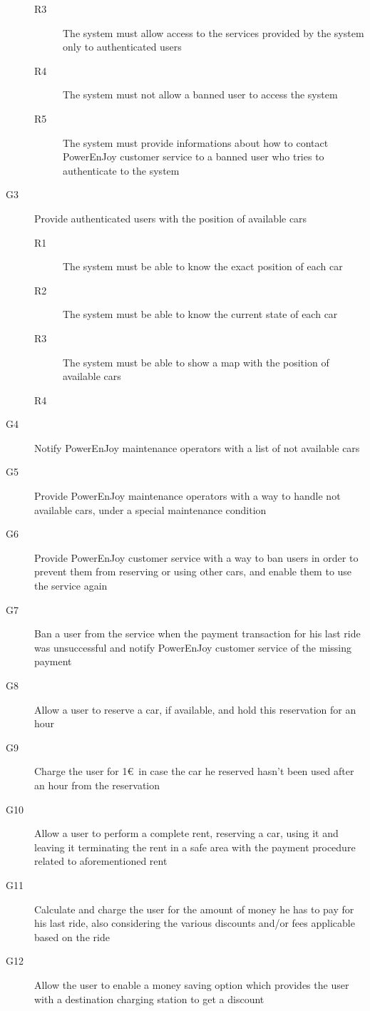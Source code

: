\begin{description}
\begin{description}
			\item[R3] The system must allow access to the services provided by the system only to authenticated users 
			\item[R4] The system must not allow a banned user to access the system
			\item[R5] The system must provide informations about how to contact PowerEnJoy customer service to a banned user who tries to authenticate to the system
		\end{description}
		\item[G3] Provide authenticated users with the position of available cars
		\begin{description}
			\item[R1] The system must be able to know the exact position of each car
			\item[R2] The system must be able to know the current state of each car
			\item[R3] The system must be able to show a map with the position of available cars
			\item[R4] 
		\end{description}
		\item[G4] Notify PowerEnJoy maintenance operators with a list of not available cars 
		\item[G5] Provide PowerEnJoy maintenance operators with a way to handle not available cars, under a special maintenance condition
		\item[G6] Provide PowerEnJoy customer service with a way to ban users in order to prevent them from reserving or using other cars, and enable them to use the service again
		\item[G7] Ban a user from the service when the payment transaction for his last ride was unsuccessful and notify PowerEnJoy customer service of the missing payment
		\item[G8] Allow a user to reserve a car, if available, and hold this reservation for an hour	
		\item[G9] Charge the user for 1\euro\ in case the car he reserved hasn't been used after an hour from the reservation
		\item[G10] Allow a user to perform a complete rent, reserving a car, using it and leaving it terminating the rent in a safe area with the payment procedure related to aforementioned rent
		\item[G11] Calculate and charge the user for the amount of money he has to pay for his last ride, also considering the various discounts and/or fees applicable based on the ride
		\item[G12] Allow the user to enable a money saving option which provides the user with a destination charging station to get a discount
	\end{description}

